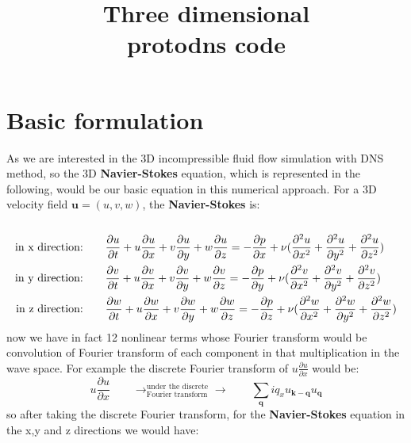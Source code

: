 \documentclass[10pt]{article}
\title{\huge{\textbf{Three dimensional  \\ \vspace{1cm} protodns code}}}
\date{}
\begin{document}
\maketitle

\section{Basic formulation}
As we are interested in the 3D incompressible fluid flow simulation with DNS method, so the 3D \textbf{Navier-Stokes} equation, which is represented in the following, would be our basic equation in this numerical approach. For a 3D velocity field $\bm{u}=(u,v,w)$, the \textbf{Navier-Stokes} is:\\
\\
%
\begin{align}
\text{in x direction:}\qquad &\frac{\partial u}{\partial t} + u\frac{\partial u}{\partial x} + v\frac{\partial u}{\partial y} + w\frac{\partial u}{\partial z} = - \frac{\partial p}{\partial x} + \nu(\frac{\partial^2 u}{\partial x^2}+\frac{\partial^2 u}{\partial y^2}+\frac{\partial^2 u}{\partial z^2})        \notag \\
\text{in y direction:}\qquad &\frac{\partial v}{\partial t} + u\frac{\partial v}{\partial x} + v\frac{\partial v}{\partial y} + w\frac{\partial v}{\partial z} = - \frac{\partial p}{\partial y} + \nu(\frac{\partial^2 v}{\partial x^2}+\frac{\partial^2 v}{\partial y^2}+\frac{\partial^2 v}{\partial z^2}) 		         \\
\text{in z direction:}\qquad &\frac{\partial w}{\partial t} + u\frac{\partial w}{\partial x} + v\frac{\partial w}{\partial y} + w\frac{\partial w}{\partial z} = - \frac{\partial p}{\partial z} + \nu(\frac{\partial^2 w}{\partial x^2}+\frac{\partial^2 w}{\partial y^2}+\frac{\partial^2 w}{\partial z^2})         \notag
\end{align}
%
now we have in fact 12 nonlinear terms whose Fourier transform would be convolution of Fourier transform of each component in that multiplication in the wave space. For example the discrete Fourier transform of $u\frac{\partial u}{\partial x}$ would be:
%
\begin{equation}
u\frac{\partial u}{\partial x} \qquad\rightarrow^{\text{under the discrete}}_{\text{Fourier transform}}\rightarrow\qquad \sum_{\bm{q}}{iq_{x}u_{\bm{k}-\bm{q}}u_{\bm{q}}}
\end{equation}
%
so after taking the discrete Fourier transform, for the \textbf{Navier-Stokes} equation in the x,y and z directions we would have:
\end{document}
